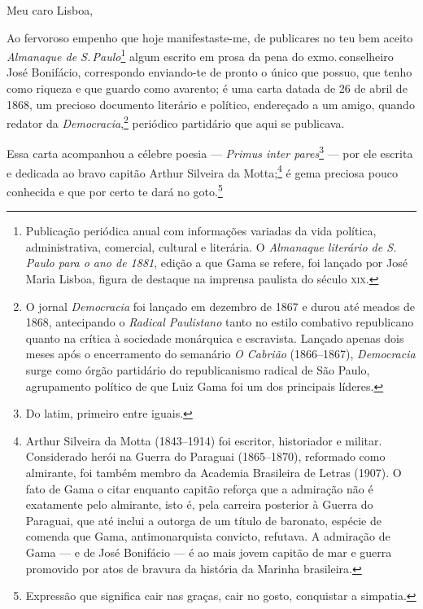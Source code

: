 {Meu caro Lisboa,

Ao fervoroso empenho que hoje manifestaste-me, de publicares no teu bem
aceito \emph{Almanaque de S.\,Paulo}\footnote{Publicação periódica anual
  com informações variadas da vida política, administrativa, comercial,
  cultural e literária. O \emph{Almanaque literário de S.\,Paulo para o
  ano de 1881}, edição a que Gama se refere, foi lançado por José Maria
  Lisboa, figura de destaque na imprensa paulista do século \textsc{xix}.} algum
escrito em prosa da pena do exmo.\,conselheiro José Bonifácio,
correspondo enviando-te de pronto o único que possuo, que tenho como
riqueza e que guardo como avarento; é uma carta datada de 26 de abril de
1868, um precioso documento literário e político, endereçado a um amigo,
quando redator da \emph{Democracia},\footnote{O jornal
  \emph{Democracia} foi lançado em dezembro de 1867 e durou até meados
  de 1868, antecipando o \emph{Radical Paulistano} tanto no estilo
  combativo republicano quanto na crítica à sociedade monárquica e
  escravista. Lançado apenas dois meses após o encerramento do semanário
  \emph{O Cabrião} (1866--1867), \emph{Democracia} surge como órgão
  partidário do republicanismo radical de São Paulo, agrupamento
  político de que Luiz Gama foi um dos principais líderes.} periódico
partidário que aqui se publicava.

Essa carta acompanhou a célebre poesia --- \textit{Primus inter pares}\footnote{
  Do latim, primeiro entre iguais.} --- por ele escrita e dedicada ao
bravo capitão Arthur Silveira da Motta;\footnote{Arthur Silveira da
  Motta (1843--1914) foi escritor, historiador e militar. Considerado
  herói na Guerra do Paraguai (1865--1870), reformado como almirante, foi
  também membro da Academia Brasileira de Letras (1907). O fato de Gama
  o citar enquanto capitão reforça que a admiração não é exatamente pelo
  almirante, isto é, pela carreira posterior à Guerra do Paraguai, que
  até inclui a outorga de um título de baronato, espécie de comenda que
  Gama, antimonarquista convicto, refutava. A admiração de Gama --- e de
  José Bonifácio --- é ao mais jovem capitão de mar e guerra promovido
  por atos de bravura da história da Marinha brasileira.} é gema
preciosa pouco conhecida e que por certo te dará no goto.\footnote{
  Expressão que significa cair nas graças, cair no gosto, conquistar a
  simpatia.}\medskip{}


}
